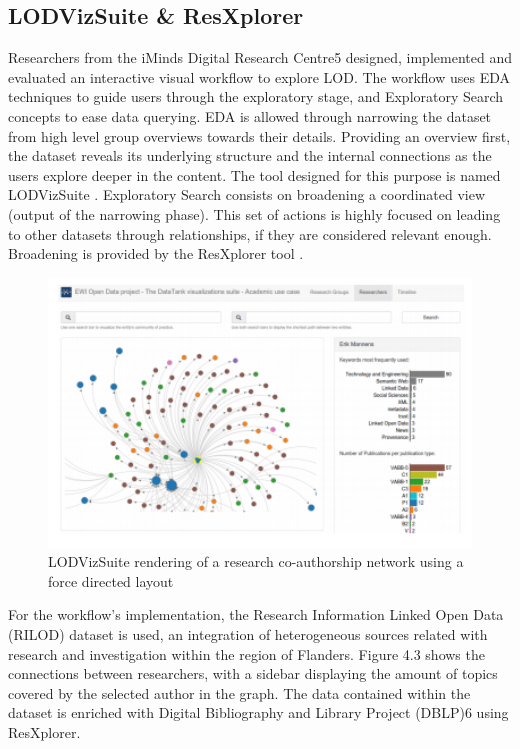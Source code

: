 \documentclass[a4paper,12pt,oneside]{report}
\begin{document}
{{{{\subsection{LODVizSuite & ResXplorer}
{Researchers from the iMinds Digital Research Centre5 designed, implemented and evaluated an interactive visual workflow to explore LOD. The workflow uses EDA techniques to guide users through the exploratory stage, and Exploratory Search  concepts
to ease data querying. EDA is allowed through narrowing the dataset from high level group overviews towards their details. Providing an overview first, the dataset reveals its underlying structure and the internal connections as the users
explore deeper in the content. The tool designed for this purpose is named LODVizSuite .
Exploratory Search consists on broadening a coordinated view (output of the narrowing phase). This set of actions is highly focused on leading to other datasets through relationships, if they are considered relevant enough. Broadening is provided by the ResXplorer tool .
\begin{figure}[h!]
\centering
\includegraphics[width=1\textwidth]{Capture11}
\caption{LODVizSuite rendering of a research co-authorship network using a force directed layout}
\end{figure} }
{For the workflow’s implementation, the Research Information Linked Open Data (RILOD) dataset is used, an integration of heterogeneous sources related with research and investigation within the region of Flanders. Figure 4.3 shows the connections between researchers, with a sidebar displaying the amount of topics covered by the selected author in the graph. The data contained within the dataset is enriched with Digital Bibliography and Library Project (DBLP)6 using ResXplorer.}
}}}}
\end{document}
